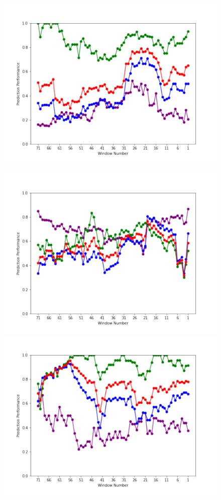 \documentclass[submit]{ipsj}
\begin{document}
\begin{figure}[t]
\begin{minipage}[b]{0.65\columnwidth}
    \includegraphics[width=1\columnwidth]{Uenaka_fig/RQ1_result/review_Keystone.pdf}
\end{minipage}
\begin{minipage}[b]{0.65\columnwidth}
    \centering
    \includegraphics[width=1\columnwidth]{Uenaka_fig/RQ1_result/review_Swift.pdf}
    \includegraphics[width=1\columnwidth]{Uenaka_fig/RQ1_result/review_Glance.pdf}

\end{minipage}
\end{figure}
\end{document}
